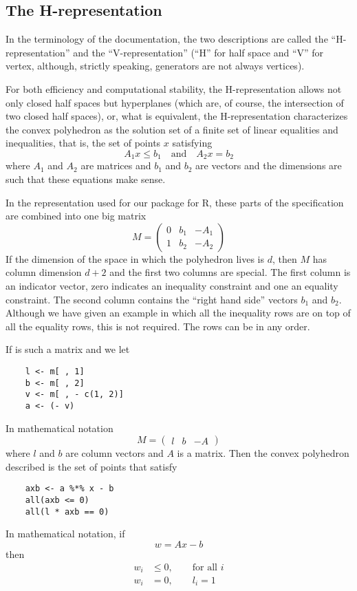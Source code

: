 \documentclass{article}
\begin{document}
\subsection{The H-representation}

In the terminology of the \verb@cddlib@ documentation,
the two descriptions are called
the ``H-representation'' and the ``V-representation''
(``H'' for half space and ``V'' for vertex,
although, strictly speaking, generators are not always vertices).

For both efficiency and computational stability, the H-representation
allows not only closed half spaces but hyperplanes (which are, of course, the
intersection of two closed half spaces), or, what is equivalent,
the H-representation characterizes the convex polyhedron as the solution
set of a finite set of linear equalities and inequalities, that is,
the set of points $x$ satisfying
$$
   A_1 x \le b_1 \quad \text{and} \quad A_2 x = b_2
$$
where $A_1$ and $A_2$ are matrices and $b_1$ and $b_2$ are vectors
and the dimensions are such that these equations make sense.

In the representation used for our \verb@rcdd@ package
for R, these parts of the specification are combined into one big matrix
$$
   M = \begin{pmatrix} 0 & b_1 & - A_1 \\ 1 & b_2 & - A_2 \end{pmatrix}
$$
If the dimension of the space in which the polyhedron lives is $d$,
then $M$ has column dimension $d + 2$ and the first two columns are special.
The first column is an indicator vector, zero indicates an inequality
constraint and one an equality constraint.  The second column contains
the ``right hand side'' vectors $b_1$ and $b_2$.  Although we have given
an example in which all the inequality rows are on top of all the equality
rows, this is not required.  The rows can be in any order.

If \verb@m@ is such a matrix and we let
\begin{verbatim}
    l <- m[ , 1]
    b <- m[ , 2]
    v <- m[ , - c(1, 2)]
    a <- (- v)
\end{verbatim}
In mathematical notation
$$
   M = \begin{pmatrix} l & b & - A \end{pmatrix}
$$
where $l$ and $b$ are column vectors and $A$ is a matrix.
Then the convex polyhedron described is the set of points \verb@x@ that
satisfy
\begin{verbatim}
    axb <- a %*% x - b
    all(axb <= 0)
    all(l * axb == 0)
\end{verbatim}
In mathematical notation, if
$$
   w = A x - b
$$
then
\begin{align*}
   w_i & \le 0, \qquad \text{for all $i$}
   \\
   w_i & = 0, \qquad l_i = 1
\end{align*}
\end{document}
